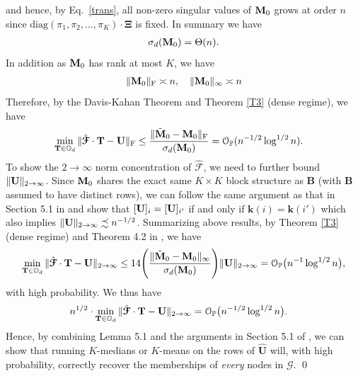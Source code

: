 \documentclass[10pt,journal,compsoc]{IEEEtran}
\newcommand{\op}{\mathcal{O}_{\mathbb{P}}}
\newcommand{\ee}{\end{aligned} \end{equation}}
\newcommand{\bds}{\boldsymbol}
\newcommand{\twoinf}{2\rightarrow \infty}
\newcommand{\bee}{\begin{equation}\begin{aligned}}
\newcommand{\M}[1]{{{\mathbf{\MakeUppercase{#1}}}}}
\newcommand{\F}{\mathrm{F}}
\numberwithin{equation}{section}
\begin{document}
and hence, by Eq.~\eqref{trans},
all non-zero singular values of $\M M_0$ grows at order $n$ since $\text{diag}(\pi_1,\pi_2,\dots,\pi_K)\cdot \bm{\Xi}$ is fixed. In summary we have
\bee\nonumber
\sigma_{d}(\M M_0)=\Theta(n).
\ee 
In addition as $\M M_0$ has rank at most $K$, we have 
\bee\label{MMFF}
\|\M M_0\|_{\F} \asymp n, \quad \|\M M_0\|_{\infty}\asymp n
\ee 
Therefore, by the Davis-Kahan Theorem \cite{davis70,yu2015useful} and Theorem \ref{T3} (dense regime), we have
\bee\label{fnormbound}
\min_{\M T \in \mathbb{O}_{d}} \|\hat{\bds{\mathcal{F}}} \cdot \mathbf{T} - \mathbf{U}\|_{\F} & \leq  \frac{\|\tilde{\M M}_0 - \M M_0\|_\F}{\sigma_d(\M M_0)} = \op(n^{-1/2}\log^{1/2}{n}).
\ee
To show the $2\rightarrow \infty$ norm concentration of $\hat{\bds{\mathcal{F}}}$, we need to further bound $\|\M U\|_{\twoinf}$. Since $\M M_0 $ shares the exact same $K\times K$ block structure as  $\mathbf{B}$ (with $\mathbf{B}$ assumed to have distinct rows), we  can follow the same argument as that in Section 5.1 in \cite{lei2019unified} and show that $[\M U]_i = [\M U]_{i'}$ if and only if $\bds k(i) = \bds k(i')$ which also implies
$\|\M U\|_{\twoinf} \precsim n^{-1/2}$.
Summarizing above results, by  Theorem \ref{T3} (dense regime) and Theorem 4.2 in \cite{cape2019two}, we have
\bee\label{twoinfnormbound}
\min_{\M T \in \mathbb{O}_{d}} \|\hat{\bds{\mathcal{F}}} \cdot \mathbf{T} - \mathbf{U}\|_{\twoinf} \leq 14\Bigg(\frac{\|\tilde{\M M}_0 - \M M_0\|_{\infty}}{\sigma_d(\M M_0)}\Bigg)\|\M U\|_{\twoinf} = \mathcal{O}_{\mathbb{P}}\big(n^{-1}\log^{1/2}{n}\big),
\ee
with high probability. We thus have
\bee\nonumber
&n^{1/2}\cdot \min_{\M T \in \mathbb{O}_{d}} \|\hat{\bds{\mathcal{F}}} \cdot \mathbf{T} - \mathbf{U}\|_{\twoinf}
 = \op\bigl( n^{-1/2}\log^{1/2}{n} \bigr).
\ee
Hence, by 
combining Lemma 5.1 and the arguments in Section 5.1 of \cite{lei2019unified}, we can show that running $K$-medians or $K$-means on the rows of $\hat{\mathbf{U}}$ will, with high probability, correctly recover the memberships of {\em every} nodes in $\mathcal{G}$.
\qed
\end{document}

